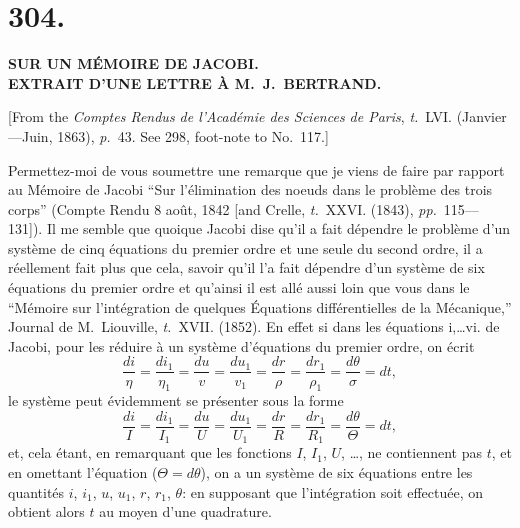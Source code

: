 \documentclass[11pt,a4paper]{article}
\newcommand{\tome}{\textit{t.}}
\newcommand{\page}{\textit{p.}}
\newcommand{\pages}{\textit{pp.}}
\begin{document}
\clearpage

\section*{304.}

\begin{center}
\textbf{SUR UN M\'{E}MOIRE DE JACOBI.}\\[0.5em]
\textbf{EXTRAIT D'UNE LETTRE \`{A} M.~J.~BERTRAND.}
\end{center}

[From the \textit{Comptes Rendus de l'Acad\'{e}mie des Sciences de Paris}, \tome~LVI. (Janvier---Juin, 1863), \page~43. See 298, foot-note to No.~117.]

\medskip

Permettez-moi de vous soumettre une remarque que je viens de faire par rapport au M\'{e}moire de Jacobi ``Sur l'\'{e}limination des noeuds dans le probl\`{e}me des trois corps'' (Compte Rendu 8 ao\^{u}t, 1842 [and Crelle, \tome~XXVI. (1843), \pages~115---131]). Il me semble que quoique Jacobi dise qu'il a fait d\'{e}pendre le probl\`{e}me d'un syst\`{e}me de cinq \'{e}quations du premier ordre et une seule du second ordre, il a r\'{e}ellement fait plus que cela, savoir qu'il l'a fait d\'{e}pendre d'un syst\`{e}me de six \'{e}quations du premier ordre et qu'ainsi il est all\'{e} aussi loin que vous dans le ``M\'{e}moire sur l'int\'{e}gration de quelques \'{E}quations diff\'{e}rentielles de la M\'{e}canique,'' Journal de M.~Liouville, \tome~XVII. (1852). En effet si dans les \'{e}quations i,\ldots vi. de Jacobi, pour les r\'{e}duire \`{a} un syst\`{e}me d'\'{e}quations du premier ordre, on \'{e}crit
\[
\frac{di}{\eta} = \frac{di_1}{\eta_1} = \frac{du}{v} = \frac{du_1}{v_1} = \frac{dr}{\rho} = \frac{dr_1}{\rho_1} = \frac{d\theta}{\sigma} = dt,
\]
le syst\`{e}me peut \'{e}videmment se pr\'{e}senter sous la forme
\[
\frac{di}{I} = \frac{di_1}{I_1} = \frac{du}{U} = \frac{du_1}{U_1} = \frac{dr}{R} = \frac{dr_1}{R_1} = \frac{d\theta}{\Theta} = dt,
\]
et, cela \'{e}tant, en remarquant que les fonctions $I$, $I_1$, $U$, \ldots, ne contiennent pas $t$, et en omettant l'\'{e}quation ($\Theta = d\theta$), on a un syst\`{e}me de six \'{e}quations entre les quantit\'{e}s $i$, $i_1$, $u$, $u_1$, $r$, $r_1$, $\theta$: en supposant que l'int\'{e}gration soit effectu\'{e}e, on obtient alors $t$ au moyen d'une quadrature.
\end{document}
